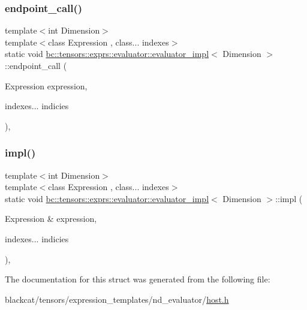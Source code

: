 \subsubsection{\texorpdfstring{endpoint\+\_\+call()}{endpoint\_call()}}
{\footnotesize\ttfamily template$<$int Dimension$>$ \\
template$<$class Expression , class... indexes$>$ \\
static void \hyperlink{structbc_1_1tensors_1_1exprs_1_1evaluator_1_1evaluator__impl}{bc\+::tensors\+::exprs\+::evaluator\+::evaluator\+\_\+impl}$<$ Dimension $>$\+::endpoint\+\_\+call (\begin{DoxyParamCaption}\item[{Expression}]{expression,  }\item[{indexes...}]{indicies }\end{DoxyParamCaption})\hspace{0.3cm}{\ttfamily [inline]}, {\ttfamily [static]}}

\mbox{\label{structbc_1_1tensors_1_1exprs_1_1evaluator_1_1evaluator__impl_a508144e14c82c035774382a50cec2a4e}} 
\subsubsection{\texorpdfstring{impl()}{impl()}}
{\footnotesize\ttfamily template$<$int Dimension$>$ \\
template$<$class Expression , class... indexes$>$ \\
static void \hyperlink{structbc_1_1tensors_1_1exprs_1_1evaluator_1_1evaluator__impl}{bc\+::tensors\+::exprs\+::evaluator\+::evaluator\+\_\+impl}$<$ Dimension $>$\+::impl (\begin{DoxyParamCaption}\item[{Expression \&}]{expression,  }\item[{indexes...}]{indicies }\end{DoxyParamCaption})\hspace{0.3cm}{\ttfamily [inline]}, {\ttfamily [static]}}



The documentation for this struct was generated from the following file\+:\begin{DoxyCompactItemize}
\item 
blackcat/tensors/expression\+\_\+templates/nd\+\_\+evaluator/\hyperlink{tensors_2expression__templates_2nd__evaluator_2host_8h}{host.\+h}\end{DoxyCompactItemize}
